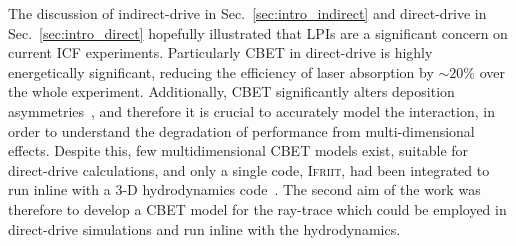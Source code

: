 The discussion of indirect-drive in Sec.~\ref{sec:intro_indirect} and direct-drive in Sec.~\ref{sec:intro_direct} hopefully illustrated that \ac{LPIs} are a significant concern on current \ac{ICF} experiments.
Particularly \ac{CBET} in direct-drive is highly energetically significant, reducing the efficiency of laser absorption by $\sim20\%$ over the whole experiment.
Additionally, \ac{CBET} significantly alters deposition asymmetries~\cite{colaitis_inverse_2021}, and therefore it is crucial to accurately model the interaction, in order to understand the degradation of performance from multi-dimensional effects.
Despite this, few multidimensional \ac{CBET} models exist, suitable for direct-drive calculations, and only a single code, \textsc{Ifriit}, had been integrated to run inline with a 3-D hydrodynamics code~\cite{colaitis_inverse_2021}.
The second aim of the work was therefore to develop a \ac{CBET} model for the ray-trace which could be employed in direct-drive simulations and run inline with the hydrodynamics.


